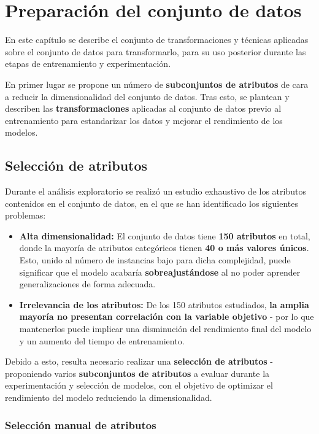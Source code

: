 \chapter{Preparación del conjunto de datos}

En este capítulo se describe el conjunto de transformaciones y técnicas aplicadas sobre el conjunto de datos para transformarlo, para su uso posterior durante las etapas de entrenamiento y experimentación.

En primer lugar se propone un número de \textbf{subconjuntos de atributos} de cara a reducir la dimensionalidad del conjunto de datos. Tras esto, se plantean y describen las \textbf{transformaciones} aplicadas al conjunto de datos previo al entrenamiento para estandarizar los datos y mejorar el rendimiento de los modelos.


\section{Selección de atributos}

Durante el análisis exploratorio se realizó un estudio exhaustivo de los atributos contenidos en el conjunto de datos, en el que se han identificado los siguientes problemas:

\begin{itemize}
	\item \textbf{Alta dimensionalidad:} El conjunto de datos tiene \textbf{150 atributos} en total, donde la mayoría de atributos categóricos tienen \textbf{40 o más valores únicos}. Esto, unido al número de instancias bajo para dicha complejidad, puede significar que el modelo acabaría \textbf{sobreajustándose} al no poder aprender generalizaciones de forma adecuada.
	\item \textbf{Irrelevancia de los atributos:} De los 150 atributos estudiados, \textbf{la amplia mayoría no presentan correlación con la variable objetivo} - por lo que mantenerlos puede implicar una disminución del rendimiento final del modelo y un aumento del tiempo de entrenamiento.
\end{itemize}

Debido a esto, resulta necesario realizar una \textbf{selección de atributos} - proponiendo varios \textbf{subconjuntos de atributos} a evaluar durante la experimentación y selección de modelos, con el objetivo de optimizar el rendimiento del modelo reduciendo la dimensionalidad.

\subsection{Selección manual de atributos}

